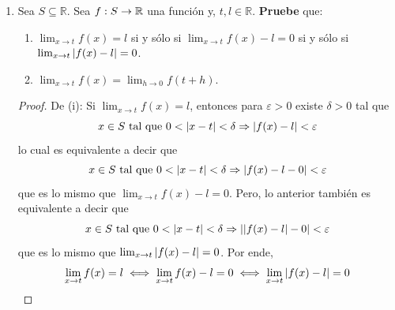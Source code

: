 \documentclass[12pt]{article}
\begin{document}
\begin{enumerate}
    \begin{sol}
    \end{sol}

    \item Sea $S\subseteq\mathbb{R}$. Sea $f:S\rightarrow\mathbb{R}$ una función y, $t,l\in\mathbb{R}$. \textbf{Pruebe} que:
    \begin{enumerate}
        \item $\lim_{ x\rightarrow t}f(x)=l$ si y sólo si $\lim_{ x\rightarrow t}f(x)-l=0$ si y sólo si $\lim_{ x\rightarrow t}\left| f(x)-l \right|=0$.
        \item $\lim_{ x\rightarrow t}f(x)=\lim_{ h\rightarrow 0}f(t+h)$.
    \end{enumerate}

    \begin{proof}
        De (i): Si $\lim_{ x\rightarrow t}f(x)=l$, entonces para $\varepsilon>0$ existe $\delta>0$ tal que
        \begin{equation*}
            x\in S\textup{ tal que }0<\left| x-t \right|<\delta\Rightarrow \left| f(x)-l \right|<\varepsilon
        \end{equation*}
        lo cual es equivalente a decir que
        \begin{equation}
            x\in S\textup{ tal que }0<\left| x-t \right|<\delta\Rightarrow \left| f(x)-l-0 \right|<\varepsilon
        \end{equation}
        que es lo mismo que $\lim_{ x\rightarrow t}f(x)-l=0$. Pero, lo anterior también es equivalente a decir que
        \begin{equation*}
            x\in S\textup{ tal que }0<\left| x-t \right|<\delta\Rightarrow \left| \left| f(x)-l \right|-0 \right|<\varepsilon
        \end{equation*}
        que es lo mismo que $\lim_{ x\rightarrow t}\left| f(x)-l \right|=0$. Por ende,
        \begin{equation*}
            \lim_{ x\rightarrow t}f(x)=l\iff \lim_{ x\rightarrow t}f(x)-l=0\iff \lim_{ x\rightarrow t}\left| f(x)-l \right|=0
        \end{equation*}


\end{proof}
\end{enumerate}
\end{document}
